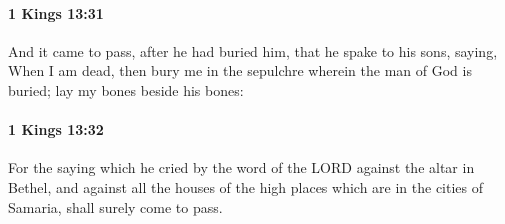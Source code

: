 		\paragraph{1 Kings 13:31} %
			\label{1KINGS-13-31}

			And it came to pass, after he had buried him, that he spake to his sons, saying, When I am dead, then bury me in the sepulchre wherein the man of God is buried; lay my bones beside his bones:


		\paragraph{1 Kings 13:32} %
			\label{1KINGS-13-32}

			For the saying which he cried by the word of the LORD against the altar in Bethel, and against all the houses of the high places which are in the cities of Samaria, shall surely come to pass.

